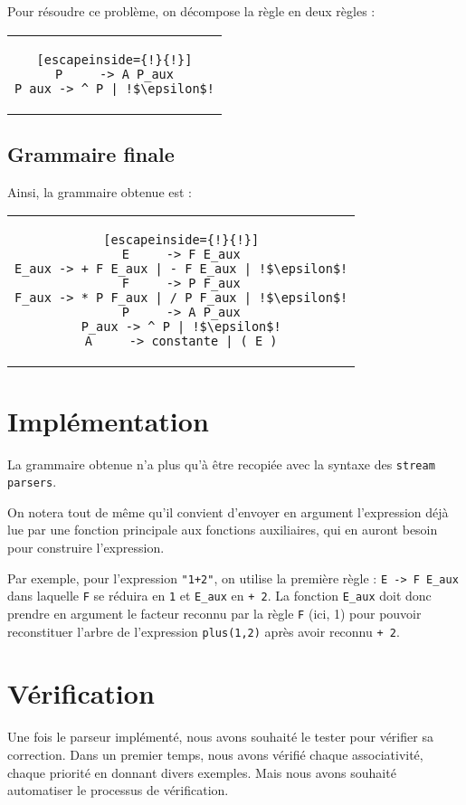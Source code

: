 \documentclass[11pt]{article}
\begin{document}
Pour résoudre ce problème, on décompose la règle en deux règles :
\begin{center}
\begin{tabular}{c}
\begin{lstlisting}[escapeinside={!}{!}]
P     -> A P_aux
P_aux -> ^ P | !$\epsilon$!
\end{lstlisting}
\end{tabular}
\end{center}

\subsection{Grammaire finale}
Ainsi, la grammaire obtenue est :
\begin{center}
\begin{tabular}{c}
\begin{lstlisting}[escapeinside={!}{!}]
E     -> F E_aux
E_aux -> + F E_aux | - F E_aux | !$\epsilon$!
F     -> P F_aux
F_aux -> * P F_aux | / P F_aux | !$\epsilon$!
P     -> A P_aux
P_aux -> ^ P | !$\epsilon$!
A     -> constante | ( E )
\end{lstlisting}
\end{tabular}
\end{center}
 

\section{Implémentation}
La grammaire obtenue n'a plus qu'à être recopiée avec la syntaxe des \texttt{stream parsers}. 

On notera tout de même qu'il convient d'envoyer en argument l'expression déjà lue par une fonction principale aux fonctions auxiliaires, qui en auront besoin pour construire l'expression. 

Par exemple,  pour l'expression \texttt{"1+2"}, on utilise la première règle : \lstinline{E -> F E_aux} dans laquelle \lstinline{F} se réduira en \lstinline{1} et \lstinline{E_aux} en \lstinline{+ 2}. La fonction \lstinline{E_aux} doit donc prendre en argument le facteur reconnu par la règle \lstinline{F} (ici, 1) pour pouvoir reconstituer l'arbre de l'expression \lstinline{plus(1,2)} après avoir reconnu \lstinline{+ 2}.


\section{Vérification}
Une fois le parseur implémenté, nous avons souhaité le tester pour vérifier sa correction.
Dans un premier temps, nous avons vérifié chaque associativité, chaque priorité en donnant divers exemples. Mais nous avons souhaité automatiser le processus de vérification.
\end{document}
